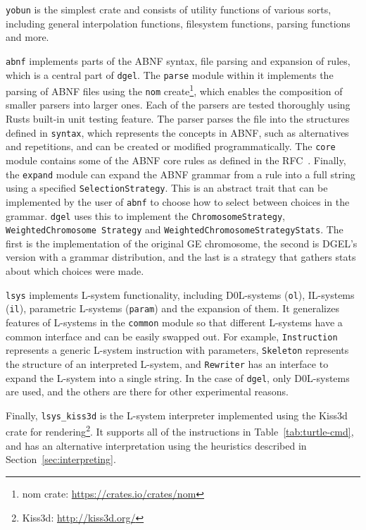 \texttt{yobun} is the simplest crate and consists of utility functions of various sorts, including general interpolation functions, filesystem functions, parsing functions and more.

\texttt{abnf} implements parts of the ABNF syntax, file parsing and expansion of rules, which is a central part of \texttt{dgel}.
The \texttt{parse} module within it implements the parsing of ABNF files using the \texttt{nom} create\footnote{nom crate: \url{https://crates.io/crates/nom}}, which enables the composition of smaller parsers into larger ones.
Each of the parsers are tested thoroughly using Rusts built-in unit testing feature.
The parser parses the file into the structures defined in \texttt{syntax}, which represents the concepts in ABNF, such as alternatives and repetitions, and can be created or modified programmatically.
The \texttt{core} module contains some of the ABNF core rules as defined in the RFC~\cite{RFC5234}.
Finally, the \texttt{expand} module can expand the ABNF grammar from a rule into a full string using a specified \texttt{SelectionStrategy}.
This is an abstract trait that can be implemented by the user of \texttt{abnf} to choose how to select between choices in the grammar.
\texttt{dgel} uses this to implement the \texttt{ChromosomeStrategy}, \texttt{WeightedChromosome Strategy} and \texttt{WeightedChromosomeStrategyStats}.
The first is the implementation of the original \gls{GE} chromosome, the second is \gls{DGEL}'s version with a grammar distribution, and the last is a strategy that gathers stats about which choices were made.

\texttt{lsys} implements \gls{L-system} functionality, including D0L-systems (\texttt{ol}), IL-systems (\texttt{il}), parametric \glspl{L-system} (\texttt{param}) and the expansion of them.
It generalizes features of \glspl{L-system} in the \texttt{common} module so that different \glspl{L-system} have a common interface and can be easily swapped out.
For example, \texttt{Instruction} represents a generic \gls{L-system} instruction with parameters, \texttt{Skeleton} represents the structure of an interpreted \gls{L-system}, and \texttt{Rewriter} has an interface to expand the \gls{L-system} into a single string.
In the case of \texttt{dgel}, only D0L-systems are used, and the others are there for other experimental reasons.

Finally, \texttt{lsys\_kiss3d} is the \gls{L-system} interpreter implemented using the Kiss3d crate for rendering\footnote{Kiss3d: \url{http://kiss3d.org/}}.
It supports all of the instructions in Table~\ref{tab:turtle-cmd}, and has an alternative interpretation using the heuristics described in Section~\ref{sec:interpreting}.


